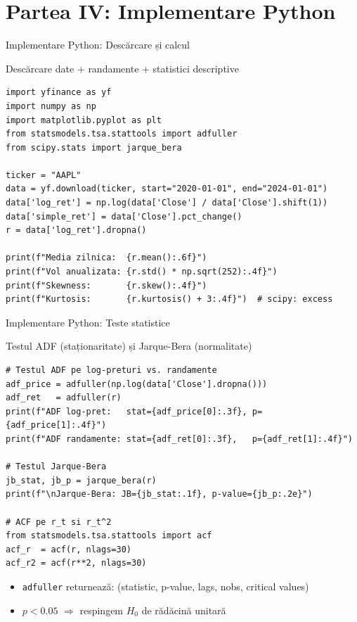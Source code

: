 \documentclass[9pt, aspectratio=169, t]{beamer}
\begin{document}
\section{Partea IV: Implementare Python}

\begin{frame}[fragile]{Implementare Python: Descărcare și calcul}
\begin{block}{Descărcare date + randamente + statistici descriptive}
\begin{lstlisting}
import yfinance as yf
import numpy as np
import matplotlib.pyplot as plt
from statsmodels.tsa.stattools import adfuller
from scipy.stats import jarque_bera

ticker = "AAPL"
data = yf.download(ticker, start="2020-01-01", end="2024-01-01")
data['log_ret'] = np.log(data['Close'] / data['Close'].shift(1))
data['simple_ret'] = data['Close'].pct_change()
r = data['log_ret'].dropna()

print(f"Media zilnica:  {r.mean():.6f}")
print(f"Vol anualizata: {r.std() * np.sqrt(252):.4f}")
print(f"Skewness:       {r.skew():.4f}")
print(f"Kurtosis:       {r.kurtosis() + 3:.4f}")  # scipy: excess
\end{lstlisting}
\end{block}
\end{frame}

\begin{frame}[fragile]{Implementare Python: Teste statistice}
\begin{block}{Testul ADF (staționaritate) și Jarque-Bera (normalitate)}
\begin{lstlisting}
# Testul ADF pe log-preturi vs. randamente
adf_price = adfuller(np.log(data['Close'].dropna()))
adf_ret   = adfuller(r)
print(f"ADF log-pret:   stat={adf_price[0]:.3f}, p={adf_price[1]:.4f}")
print(f"ADF randamente: stat={adf_ret[0]:.3f},   p={adf_ret[1]:.4f}")

# Testul Jarque-Bera
jb_stat, jb_p = jarque_bera(r)
print(f"\nJarque-Bera: JB={jb_stat:.1f}, p-value={jb_p:.2e}")

# ACF pe r_t si r_t^2
from statsmodels.tsa.stattools import acf
acf_r  = acf(r, nlags=30)
acf_r2 = acf(r**2, nlags=30)
\end{lstlisting}
\end{block}
{\small
\begin{itemize}\setlength{\itemsep}{0pt}
    \item \texttt{adfuller} returnează: (statistic, p-value, lags, nobs, critical values)
    \item $p < 0.05$ $\Rightarrow$ respingem $H_0$ de rădăcină unitară
\end{itemize}}
\end{frame}
\end{document}

